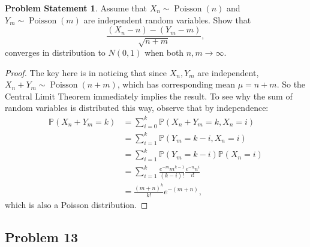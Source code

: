 \documentclass[12pt,reqno]{article}
\theoremstyle{plain}
\theoremstyle{definition}
\newtheorem{problem}[theorem]{Problem Statement}
\newcommand{\PP}[1]{\ensuremath{\mathbb{P}\left(#1\right)}}
\begin{document}
\begin{problem} 
Assume that $X_n \sim \operatorname{Poisson}(n)$ and 
$Y_m \sim \operatorname{Poisson}(m)$ are independent random variables. 
Show that 
\[
\frac{(X_n-n) - (Y_m-m)}{\sqrt{n+m}}, 
\]
converges in distribution to $N(0, 1)$ when both $n,m \rightarrow \infty$. 
\end{problem} 
\begin{proof} 
The key here is in noticing that since $X_n,Y_m$ are independent, 
$X_n+Y_m \sim \operatorname{Poisson}(n+m)$, which has corresponding 
mean $\mu = n+m$. So the Central Limit Theorem immediately implies the 
result. To see why the sum of random variables is distributed this way, 
observe that by independence:
\begin{align*} 
\PP{X_n+Y_m=k} & = \sum_{i=0}^{k} \PP{X_n+Y_m=k,X_n=i} \\ 
     & = \sum_{i=1}^k \PP{Y_m = k-i,X_n=i} \\ 
     & = \sum_{i=1}^k \PP{Y_m = k-i} \PP{X_n = i} \\ 
     & = \sum_{i=1}^k \frac{e^{-m} m^{k-1}}{(k-i)!} 
     \frac{e^{-n} n^i}{i!} \\ 
     & = \frac{(m+n)^k}{k!} e^{-(m+n)}, 
\end{align*} 
which is also a Poisson distribution. 
\end{proof} 

\subsection{Problem 13}
\end{document}

